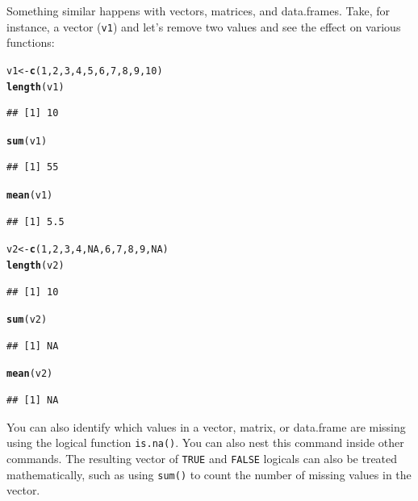 \documentclass[12pt]{article}\usepackage[]{graphicx}\usepackage[]{color}
\makeatletter
\newcommand{\hlnum}[1]{\textcolor[rgb]{0.686,0.059,0.569}{#1}}%
\newcommand{\hlstd}[1]{\textcolor[rgb]{0.345,0.345,0.345}{#1}}%
\newcommand{\hlkwb}[1]{\textcolor[rgb]{0.69,0.353,0.396}{#1}}%
\newcommand{\hlkwd}[1]{\textcolor[rgb]{0.737,0.353,0.396}{\textbf{#1}}}%
\newenvironment{kframe}{%
 \def\at@end@of@kframe{}%
 \ifinner\ifhmode%
  \def\at@end@of@kframe{\end{minipage}}%
  \begin{minipage}{\columnwidth}%
 \fi\fi%
 \def\FrameCommand##1{\hskip\@totalleftmargin \hskip-\fboxsep
 \colorbox{shadecolor}{##1}\hskip-\fboxsep
     \hskip-\linewidth \hskip-\@totalleftmargin \hskip\columnwidth}%
 \MakeFramed {\advance\hsize-\width
   \@totalleftmargin\z@ \linewidth\hsize
   \@setminipage}}%
 {\par\unskip\endMakeFramed%
 \at@end@of@kframe}
\newenvironment{knitrout}{}{} %
\makeatother
\begin{document}
Something similar happens with vectors, matrices, and data.frames. Take, for instance, a vector (\texttt{v1}) and let's remove two values and see the effect on various functions:

\begin{knitrout}
\color{fgcolor}\begin{kframe}
\begin{alltt}
\hlstd{v1} \hlkwb{<-} \hlkwd{c}\hlstd{(}\hlnum{1}\hlstd{,}\hlnum{2}\hlstd{,}\hlnum{3}\hlstd{,}\hlnum{4}\hlstd{,}\hlnum{5}\hlstd{,}\hlnum{6}\hlstd{,}\hlnum{7}\hlstd{,}\hlnum{8}\hlstd{,}\hlnum{9}\hlstd{,}\hlnum{10}\hlstd{)}
\hlkwd{length}\hlstd{(v1)}
\end{alltt}
\begin{verbatim}
## [1] 10
\end{verbatim}
\begin{alltt}
\hlkwd{sum}\hlstd{(v1)}
\end{alltt}
\begin{verbatim}
## [1] 55
\end{verbatim}
\begin{alltt}
\hlkwd{mean}\hlstd{(v1)}
\end{alltt}
\begin{verbatim}
## [1] 5.5
\end{verbatim}
\begin{alltt}
\hlstd{v2} \hlkwb{<-} \hlkwd{c}\hlstd{(}\hlnum{1}\hlstd{,}\hlnum{2}\hlstd{,}\hlnum{3}\hlstd{,}\hlnum{4}\hlstd{,}\hlnum{NA}\hlstd{,}\hlnum{6}\hlstd{,}\hlnum{7}\hlstd{,}\hlnum{8}\hlstd{,}\hlnum{9}\hlstd{,}\hlnum{NA}\hlstd{)}
\hlkwd{length}\hlstd{(v2)}
\end{alltt}
\begin{verbatim}
## [1] 10
\end{verbatim}
\begin{alltt}
\hlkwd{sum}\hlstd{(v2)}
\end{alltt}
\begin{verbatim}
## [1] NA
\end{verbatim}
\begin{alltt}
\hlkwd{mean}\hlstd{(v2)}
\end{alltt}
\begin{verbatim}
## [1] NA
\end{verbatim}
\end{kframe}
\end{knitrout}

You can also identify which values in a vector, matrix, or data.frame are missing using the logical function \texttt{is.na()}. You can also nest this command inside other commands. The resulting vector of \texttt{TRUE} and \texttt{FALSE} logicals can also be treated mathematically, such as using \texttt{sum()} to count the number of missing values in the vector.
\end{document}
